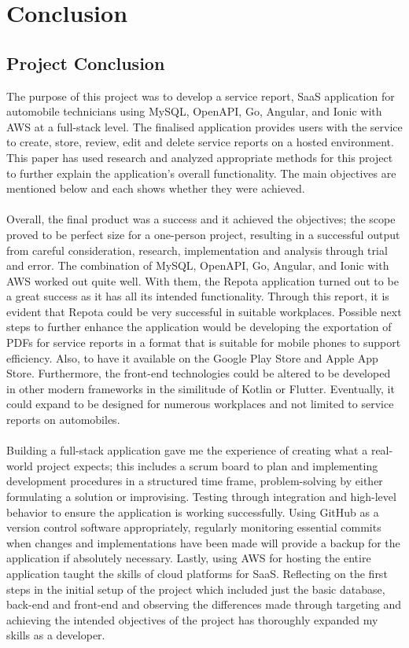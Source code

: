 \chapter{Conclusion}

\section{Project Conclusion}
The purpose of this project was to develop a service report, SaaS application for automobile technicians using MySQL, OpenAPI, Go, Angular, and Ionic with AWS at a full-stack level. The finalised application provides users with the service to create, store, review, edit and delete service reports on a hosted environment. This paper has used research and analyzed appropriate methods for this project to further explain the application's overall functionality. The main objectives are mentioned below and each shows whether they were achieved.
\\\\ Overall, the final product was a success and it achieved the objectives; the scope proved to be perfect size for a one-person project, resulting in a successful output from careful consideration, research, implementation and analysis through trial and error. The combination of MySQL, OpenAPI, Go, Angular, and Ionic with AWS worked out quite well. With them, the Repota application turned out to be a great success as it has all its intended functionality. Through this report, it is evident that Repota could be very successful in suitable workplaces. Possible next steps to further enhance the application would be developing the exportation of PDFs for service reports in a format that is suitable for mobile phones to support efficiency. Also, to have it available on the Google Play Store and Apple App Store. Furthermore, the front-end technologies could be altered to be developed in other modern frameworks in the similitude of Kotlin or Flutter. Eventually, it could expand to be designed for numerous workplaces and not limited to service reports on automobiles.
\\\\ Building a full-stack application gave me the experience of creating what a real-world project expects; this includes a scrum board to plan and implementing development procedures in a structured time frame, problem-solving by either formulating a solution or improvising. Testing through integration and high-level behavior to ensure the application is working successfully. Using GitHub as a version control software appropriately, regularly monitoring essential commits when changes and implementations have been made will provide a backup for the application if absolutely necessary. Lastly, using AWS for hosting the entire application taught the skills of cloud platforms for SaaS. Reflecting on the first steps in the initial setup of the project which included just the basic database, back-end and front-end and observing the differences made through targeting and achieving the intended objectives of the project has thoroughly expanded my skills as a developer. 


